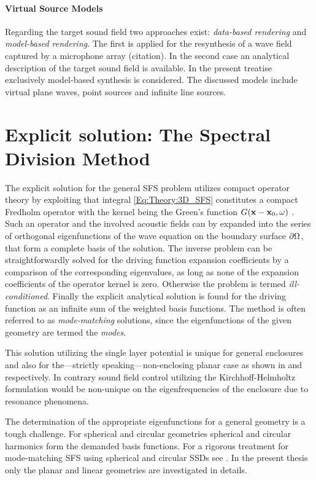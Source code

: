 \paragraph{Virtual Source Models}
Regarding the target sound field two approaches exist: \emph{data-based rendering} and \emph{model-based rendering}. The first is applied for the resynthesis of a wave field captured by a microphone array (citation). In the second case an analytical description of the target sound field is available. In the present treatise exclusively model-based synthesis is considered. The discussed models include virtual plane waves, point sources and infinite line sources.


\newpage
\section{Explicit solution: The Spectral Division Method}

The explicit solution for the general SFS problem utilizes compact operator theory by exploiting that integral \eqref{Eq:Theory:3D_SFS} constitutes a compact Fredholm operator with the kernel being the Green's function $G(\mathbf{x} - \mathbf{x}_0 , \omega )$ \cite{Ahrens2012,MorseFeshbach1953}.
Such an operator and the involved acoustic fields can by expanded into the series of orthogonal eigenfunctions of the wave equation on the boundary surface $\partial \Omega$, that form a complete basis of the solution.
The inverse problem can be straightforwardly solved for the driving function expansion coefficients by a comparison of the corresponding eigenvalues, as long as none of the expansion coefficients of the operator kernel is zero.
Otherwise the problem is termed \emph{ill-conditioned}.
Finally the explicit analytical solution is found for the driving function as an infinite sum of the weighted basis functions.
The method is often referred to as \emph{mode-matching} solutions, since the eigenfunctions of the given geometry are termed the \emph{modes}.

This solution utilizing the single layer potential is unique for general enclosures and also for the---strictly speaking---non-enclosing planar case as shown in \cite{Zotter2013:uniqueness} and \cite{Fazi2010} respectively. In contrary sound field control utilizing the Kirchhoff-Helmholtz formulation would be non-unique on the eigenfrequencies of the enclosure due to resonance phenomena.

The determination of the appropriate eigenfunctions for a general geometry is a tough challenge.
For spherical and circular geometries spherical and circular harmonics form the demanded basis functions. For a rigorous treatment for mode-matching SFS using spherical and circular SSDs see \cite{Ahrens2010phd,Zotter2009phd,Ahrens2012,Ahrens2009:circularSSD_mismatch,Ahrens2009:circular25D_SFR,Ahrens2008:Analytical_Circ_Spherical_SFS}.
In the present thesis only the planar and linear geometries are investigated in details.

